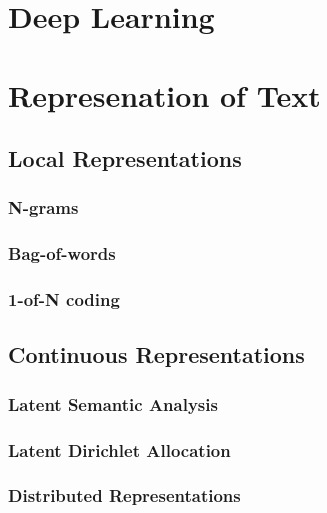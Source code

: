 \section{Deep Learning}
\label{sec:deep_learning}


\section{Represenation of Text}
\label{sec:rel_represenation_text}


\subsection{Local Representations}
\label{sec:rel_local_representation}

\subsubsection{N-grams}
\label{sec:sub_ngrams}

\subsubsection{Bag-of-words}
\label{sec:rel_bow}

\subsubsection{1-of-N coding}
\label{sec:1_of_coding}

\subsection{Continuous Representations}
\label{sec:sub_continuous_representation}

\subsubsection{Latent Semantic Analysis}
\label{sec:rel_local_representation}

\subsubsection{Latent Dirichlet Allocation}
\label{sec:rel_lda}

\subsubsection{Distributed Representations}
\label{sec:dis_rep}





